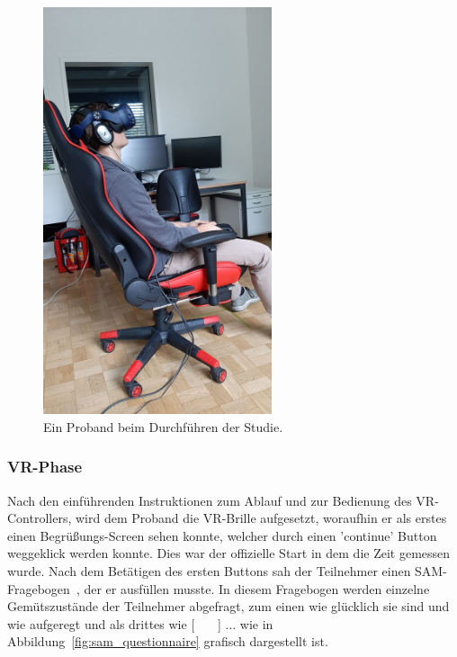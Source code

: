 \begin{figure}[H]
	\centering
	\includegraphics[width=0.6\textwidth]{./images/studie_awf.jpeg}
	\caption{Ein Proband beim Durchführen der Studie.}
	\label{fig:study_setup}
\end{figure}


\subsubsection{VR-Phase}
Nach den einführenden Instruktionen zum Ablauf und zur Bedienung des VR-Controllers, wird dem Proband die VR-Brille aufgesetzt, woraufhin er als erstes einen Begrüßungs-Screen sehen konnte, welcher durch einen 'continue' Button weggeklick werden konnte. 
Dies war der offizielle Start in dem die Zeit gemessen wurde. 
Nach dem Betätigen des ersten Buttons sah der Teilnehmer einen SAM-Fragebogen~\cite{bradley1994measuring}, der er ausfüllen musste. 
In diesem Fragebogen werden einzelne Gemütszustände der Teilnehmer abgefragt, zum einen wie glücklich sie sind und wie aufgeregt und als drittes wie [ \ \ \ ] ...  wie in Abbildung~\ref{fig:sam_questionnaire} grafisch dargestellt ist.

